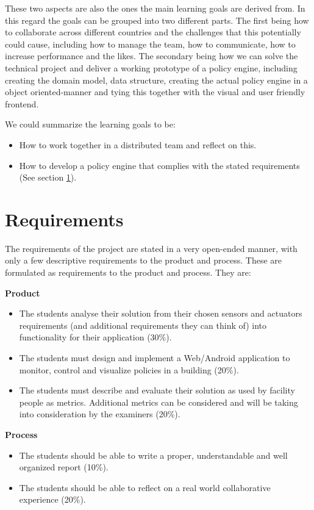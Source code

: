These two aspects are also the ones the main learning goals are derived from. In this regard the goals can be grouped into two different parts. The first being how to collaborate across different countries and the challenges that this potentially could cause, including how to manage the team, how to communicate, how to increase performance and the likes. The secondary being how we can solve the technical project and deliver a working prototype of a policy engine, including creating the domain model, data structure, creating the actual policy engine in a object oriented-manner and tying this together with the visual and user friendly frontend.

We could summarize the learning goals to be: 
\begin{itemize}
\item How to work together in a distributed team and reflect on this.
\item How to develop a policy engine that complies with the stated requirements (See section \ref{sec:requirements}).
\end{itemize}

\section{Requirements} \label{sec:requirements}
The requirements of the project are stated in a very open-ended manner, with only a few descriptive requirements to the product and process. These are formulated as requirements to the product and process. They are:

\textbf{Product}
\begin{itemize}
	\item The students analyse their solution from their chosen sensors and actuators requirements (and additional requirements they can think of) into functionality for their application (30\%).
	\item The students must design and implement a Web/Android application to monitor, control and visualize policies in a building (20\%).
	\item The students must describe and evaluate their solution as used by facility people as metrics. Additional metrics can be considered and will be taking into consideration by the examiners (20\%).
\end{itemize}

\textbf{Process}
\begin{itemize}
	\item The students should be able to write a proper, understandable and well organized report (10\%).
	\item The students should be able to reflect on a real world collaborative experience (20\%).
\end{itemize}
